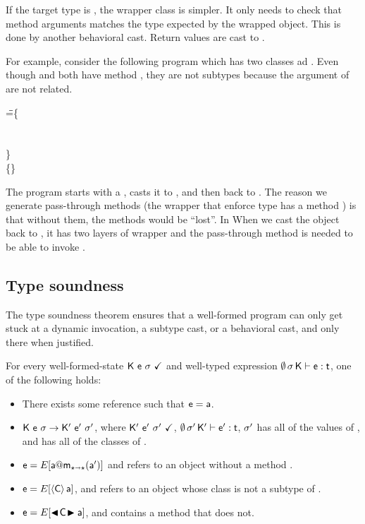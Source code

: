 \documentclass[USenglish]{tex/lipics-v2016}
\begin{document}
If the target type is \any, the wrapper class is simpler. It only needs to
check that method arguments matches the type expected by the wrapped
object. This is done by another behavioral cast. Return values are cast to
\any.

For example, consider the following program which has two classes \C ad \D.
Even though \C and \D both have method \a, they are not subtypes because the
argument of \m are not related.

\begin{tabbing}\small
\hspace{1cm}
 \HS\HS\HS\WHERE\HS
  \K\HS =\HS \= \class\= \C \{\\
       \> \HS \Mdef\m\x\any\any{\HS\x\HS}\\
       \> \HS \Mdef\n\x\any\any{\HS\x\HS}\\
       \> \}  \\
       \>\class \D \{\HS \Mdef\m\x\Int\Int{\HS\x\HS}\HS \}
\end{tabbing}

\noindent
The program starts with a \C, casts it to \D, and then back to \C. The
reason we generate pass-through methods (the wrapper that enforce type \D
has a method \n) is that without them, the methods would be ``lost''. In
When we cast the object back to \C, it has two layers of wrapper
and the pass-through method is needed to be able to invoke \n.

\subsection{Type soundness}

The \kafka type soundness theorem ensures that a well-formed program can
only get stuck at a dynamic invocation, a subtype cast, or a behavioral
cast, and only there when justified.

\begin{theorem}

\noindent For every well-formed-state $\WFq{\K~\e~\s}$ and well-typed
expression $\EnvType\emptyset\s\K\e\t$, one of the following holds:

\begin{itemize}
\item There exists some reference \a such that $\e = \a$.
\item $\K~\e~\s\Red\Kp~\ep~\sp$, where $\WFq{\Kp~\ep~\sp}$,
  $\EnvType\emptyset\sp\Kp\ep\t$, $\sp$ has all of the values of \s, and \Kp
  has all of the classes of \K.
\item $\e=E[\DynCall\a\m\ap]$ and \a refers to an object without a method \m.
\item $\e=E[\SubCast\C\a]$, and \a refers to an object whose class is not
  a subtype of \C.
\item $\e=E[\BehCast\C\a]$, and \C contains a method that \a does not.
\end{itemize}
\end{theorem}
\end{document}
